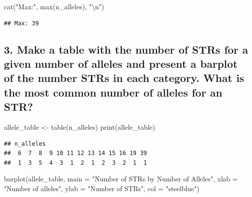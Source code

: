 \documentclass[
]{article}
\newenvironment{Shaded}{\begin{snugshade}}{\end{snugshade}}
\newcommand{\AttributeTok}[1]{\textcolor[rgb]{0.77,0.63,0.00}{#1}}
\newcommand{\FunctionTok}[1]{\textcolor[rgb]{0.00,0.00,0.00}{#1}}
\newcommand{\NormalTok}[1]{#1}
\newcommand{\OtherTok}[1]{\textcolor[rgb]{0.56,0.35,0.01}{#1}}
\newcommand{\SpecialCharTok}[1]{\textcolor[rgb]{0.00,0.00,0.00}{#1}}
\newcommand{\StringTok}[1]{\textcolor[rgb]{0.31,0.60,0.02}{#1}}
\begin{document}
\begin{Shaded}
\begin{Highlighting}[]
\FunctionTok{cat}\NormalTok{(}\StringTok{"Max:"}\NormalTok{, }\FunctionTok{max}\NormalTok{(n\_alleles), }\StringTok{"}\SpecialCharTok{\textbackslash{}n}\StringTok{"}\NormalTok{)}
\end{Highlighting}
\end{Shaded}

\begin{verbatim}
## Max: 39
\end{verbatim}

\hypertarget{make-a-table-with-the-number-of-strs-for-a-given-number-of-alleles-and-present-a-barplot-of-the-number-strs-in-each-category.-what-is-the-most-common-number-of-alleles-for-an-str}{%
\subsection{3. Make a table with the number of STRs for a given number
of alleles and present a barplot of the number STRs in each category.
What is the most common number of alleles for an
STR?}\label{make-a-table-with-the-number-of-strs-for-a-given-number-of-alleles-and-present-a-barplot-of-the-number-strs-in-each-category.-what-is-the-most-common-number-of-alleles-for-an-str}}

\begin{Shaded}
\begin{Highlighting}[]
\NormalTok{allele\_table }\OtherTok{\textless{}{-}} \FunctionTok{table}\NormalTok{(n\_alleles)}
\FunctionTok{print}\NormalTok{(allele\_table)}
\end{Highlighting}
\end{Shaded}

\begin{verbatim}
## n_alleles
##  6  7  8  9 10 11 12 13 14 15 16 19 39 
##  1  3  5  4  3  1  2  1  2  3  2  1  1
\end{verbatim}

\begin{Shaded}
\begin{Highlighting}[]
\FunctionTok{barplot}\NormalTok{(allele\_table,}
        \AttributeTok{main =} \StringTok{"Number of STRs by Number of Alleles"}\NormalTok{,}
        \AttributeTok{xlab =} \StringTok{"Number of alleles"}\NormalTok{,}
        \AttributeTok{ylab =} \StringTok{"Number of STRs"}\NormalTok{,}
        \AttributeTok{col =} \StringTok{"steelblue"}\NormalTok{)}
\end{Highlighting}
\end{Shaded}
\end{document}
